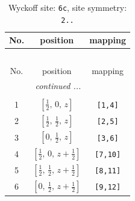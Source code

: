 \documentclass[fleqn,8pt]{jsarticle}
\begin{document}
\renewcommand{\arraystretch}{1.2}
\begin{longtable}{ccc}
\caption{Wyckoff site: {\tt 6c}, site symmetry: {\tt 2..}}
 \\
 \hline \hline
No. & position & mapping \\ \hline \endfirsthead

\multicolumn{2}{l}{\tablename\ \thetable{}} \\
 \hline \hline
No. & position & mapping \\ \hline \endhead

 \hline \hline
\multicolumn{2}{r}{\footnotesize\it continued ...} \\ \endfoot

 \hline \hline
\multicolumn{2}{r}{} \\ \endlastfoot

1 & $\left[ \frac{1}{2},\, 0,\, z \right]$ & {\tt [1,4]} \\ \hline
2 & $\left[ \frac{1}{2},\, \frac{1}{2},\, z \right]$ & {\tt [2,5]} \\ \hline
3 & $\left[ 0,\, \frac{1}{2},\, z \right]$ & {\tt [3,6]} \\ \hline
4 & $\left[ \frac{1}{2},\, 0,\, z + \frac{1}{2} \right]$ & {\tt [7,10]} \\ \hline
5 & $\left[ \frac{1}{2},\, \frac{1}{2},\, z + \frac{1}{2} \right]$ & {\tt [8,11]} \\ \hline
6 & $\left[ 0,\, \frac{1}{2},\, z + \frac{1}{2} \right]$ & {\tt [9,12]} \\
\end{longtable}
\renewcommand{\arraystretch}{1.2}
\end{document}
